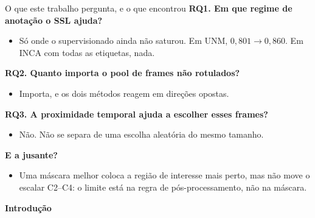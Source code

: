 \documentclass[aspectratio=169]{beamer}
\begin{document}
\begin{frame}{O que este trabalho pergunta, e o que encontrou}
  \vspace{0.3em}
  \textbf{RQ1. Em que regime de anotação o SSL ajuda?}
  \begin{itemize}\footnotesize
    \item Só onde o supervisionado ainda não saturou. Em UNM, $0{,}801 \rightarrow 0{,}860$. Em INCA com todas as etiquetas, nada.
  \end{itemize}

  \smallskip
  \textbf{RQ2. Quanto importa o pool de frames não rotulados?}
  \begin{itemize}\footnotesize
    \item Importa, e os dois métodos reagem em direções opostas.
  \end{itemize}

  \smallskip
  \textbf{RQ3. A proximidade temporal ajuda a escolher esses frames?}
  \begin{itemize}\footnotesize
    \item Não. Não se separa de uma escolha aleatória do mesmo tamanho.
  \end{itemize}

  \smallskip
  \textbf{E a jusante?}
  \begin{itemize}\footnotesize
    \item Uma máscara melhor coloca a região de interesse mais perto, mas não move o escalar C2--C4: o limite está na regra de pós-processamento, não na máscara.
  \end{itemize}

\end{frame}

\begin{frame}[plain]
  \centering
  \vfill
  {\Huge\bfseries Introdução}
  \vfill
\end{frame}
\end{document}
